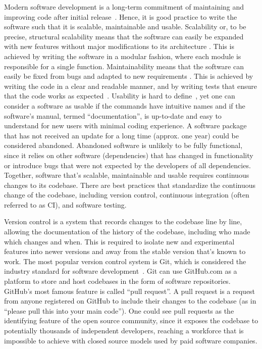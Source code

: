 Modern software development is a long-term commitment of maintaining and
improving code after initial release~\cite{boswellArtReadableCode2011}. Hence,
it is good practice to write the software such that it is scalable, maintainable
and usable. Scalability or, to be precise, structural scalability means that the
software can easily be expanded with new features without major modifications to
its architecture \cite{bondiCharacteristicsScalabilityTheir2000}. This is
achieved by writing the software in a modular fashion, where each module is
responsible for a single function. Maintainability means that the software can
easily be fixed from bugs and adapted to new requirements
\cite{kazmanMaintainability2020}. This is achieved by writing the code in a
clear and readable manner, and by writing tests that ensure that the code works
as expected~\cite{boswellArtReadableCode2011}. Usability is hard to
define~\cite{brookeSUSQuickDirty1996}, yet one can consider a software as usable
if the commands have intuitive names and if the software's manual, termed
``documentation'', is up-to-date and easy to understand for new users with
minimal coding experience. A software package that has not received an update
for a long time (approx. one year) could be considered abandoned. Abandoned
software is unlikely to be fully functional, since it relies on other software
(dependencies) that has changed in functionality or introduce bugs that were not
expected by the developers of all dependencies. Together, software that's
scalable, maintainable and usable requires continuous changes to its codebase.
There are best practices that standardize the continuous change of the codebase,
including version control, continuous integration (often referred to as CI), and
software testing.

Version control is a system that records changes to the codebase line by line,
allowing the documentation of the history of the codebase, including who made
which changes and when. This is required to isolate new and experimental
features into newer versions and away from the stable version that's known to
work. The most popular version control system is Git, which is considered the
industry standard for software development~\cite{chaconGitBook2024}. Git can use
GitHub.com as a platform to store and host codebases in the form of software
repositories. GitHub's most famous feature is called ``pull request''. A pull
request is a request from anyone registered on GitHub to include their changes
to the codebase (as in ``please pull this into your main code''). One could see
pull requests as the identifying feature of the open source community, since it
exposes the codebase to potentially thousands of independent developers,
reaching a workforce that is impossible to achieve with closed source models
used by paid software companies.

